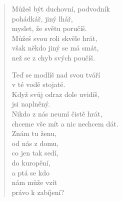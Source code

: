 \begin{verse}
 Můžeš být duchovní, podvodník \\
 pohádkář, jiný lhář, \\
 myslet, že světu poručíš. \\
 Můžeš svou roli skvěle hrát, \\
 však někdo jiný se má smát, \\
 než se z chyb svých poučíš.
 
 Teď se modlíš nad svou tváří  \\
 v té vodě stojaté. \\
 Když svůj odraz dole uvidíš, \\
 jsi naplněný. \\
 Nikdo z nás neumí čistě hrát, \\
 chceme vše mít a nic nechcem dát. \\
 Znám tu ženu, \\
 od nás z domu, \\
 co jen tak sedí, \\
 do kuropění, \\
 a ptá se kdo  \\
 nám může vzít \\
 právo k zabíjení?
\end{verse}
